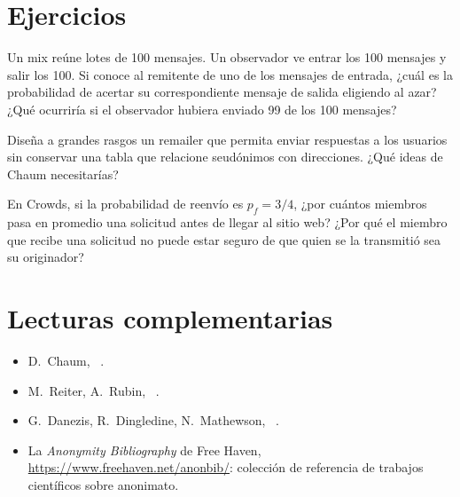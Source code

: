 \section*{Ejercicios}

\begin{esercizio}[1]\label{es:02-mix}
Un mix reúne lotes de 100 mensajes. Un observador ve entrar los 100 mensajes y salir los 100. Si conoce al remitente de uno de los mensajes de entrada, ¿cuál es la probabilidad de acertar su correspondiente mensaje de salida eligiendo al azar? ¿Qué ocurriría si el observador hubiera enviado 99 de los 100 mensajes?
\end{esercizio}

\begin{esercizio}[2]\label{es:02-penet}
Diseña a grandes rasgos un remailer que permita enviar respuestas a los usuarios sin conservar una tabla que relacione seudónimos con direcciones. ¿Qué ideas de Chaum necesitarías?
\end{esercizio}

\begin{esercizio}[2]\label{es:02-crowds}
En Crowds, si la probabilidad de reenvío es $p_f = 3/4$, ¿por cuántos miembros pasa en promedio una solicitud antes de llegar al sitio web? ¿Por qué el miembro que recibe una solicitud no puede estar seguro de que quien se la transmitió sea su originador?
\end{esercizio}

\section*{Lecturas complementarias}
\begin{itemize}
  \item D.~Chaum, ~\cite{chaum1981untraceable}.
  \item M.~Reiter, A.~Rubin, ~\cite{reiter1998crowds}.
  \item G.~Danezis, R.~Dingledine, N.~Mathewson, ~\cite{danezis2003mixminion}.
  \item La \emph{Anonymity Bibliography} de Free Haven, \url{https://www.freehaven.net/anonbib/}: colección de referencia de trabajos científicos sobre anonimato.
\end{itemize}
